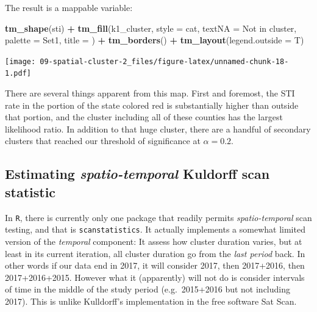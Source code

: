 \documentclass[
]{book}
\newenvironment{Shaded}{\begin{snugshade}}{\end{snugshade}}
\newcommand{\AttributeTok}[1]{\textcolor[rgb]{0.13,0.29,0.53}{#1}}
\newcommand{\FunctionTok}[1]{\textcolor[rgb]{0.13,0.29,0.53}{\textbf{#1}}}
\newcommand{\NormalTok}[1]{#1}
\newcommand{\SpecialCharTok}[1]{\textcolor[rgb]{0.81,0.36,0.00}{\textbf{#1}}}
\newcommand{\StringTok}[1]{\textcolor[rgb]{0.31,0.60,0.02}{#1}}
\begin{document}
The result is a mappable variable:

\begin{Shaded}
\begin{Highlighting}[]
\FunctionTok{tm\_shape}\NormalTok{(sti) }\SpecialCharTok{+}
  \FunctionTok{tm\_fill}\NormalTok{(}\StringTok{\textquotesingle{}k1\_cluster\textquotesingle{}}\NormalTok{,}
          \AttributeTok{style =} \StringTok{\textquotesingle{}cat\textquotesingle{}}\NormalTok{,}
          \AttributeTok{textNA =} \StringTok{\textquotesingle{}Not in cluster\textquotesingle{}}\NormalTok{,}
          \AttributeTok{palette =} \StringTok{\textquotesingle{}Set1\textquotesingle{}}\NormalTok{,}
          \AttributeTok{title =} \StringTok{\textquotesingle{}\textquotesingle{}}\NormalTok{) }\SpecialCharTok{+} 
  \FunctionTok{tm\_borders}\NormalTok{() }\SpecialCharTok{+} 
  \FunctionTok{tm\_layout}\NormalTok{(}\AttributeTok{legend.outside =}\NormalTok{ T)}
\end{Highlighting}
\end{Shaded}

\texttt{[image: 09-spatial-cluster-2\_files/figure-latex/unnamed-chunk-18-1.pdf]}

There are several things apparent from this map. First and foremost, the STI rate in the portion of the state colored red is substantially higher than outside that portion, and the cluster including all of these counties has the largest likelihood ratio. In addition to that huge cluster, there are a handful of secondary clusters that reached our threshold of significance at \(\alpha = 0.2\).

\hypertarget{estimating-spatio-temporal-kuldorff-scan-statistic}{%
\subsection{\texorpdfstring{Estimating \emph{spatio-temporal} Kuldorff scan statistic}{Estimating spatio-temporal Kuldorff scan statistic}}\label{estimating-spatio-temporal-kuldorff-scan-statistic}}

In \texttt{R}, there is currently only one package that readily permits \emph{spatio-temporal} scan testing, and that is \texttt{scanstatistics}. It actually implements a somewhat limited version of the \emph{temporal} component: It assess how cluster duration varies, but at least in its current iteration, all cluster duration go from the \emph{last period} back. In other words if our data end in 2017, it will consider 2017, then 2017+2016, then 2017+2016+2015. However what it (apparently) will not do is consider intervals of time in the middle of the study period (e.g.~2015+2016 but not including 2017). This is unlike Kulldorff's implementation in the free software Sat Scan.
\end{document}
